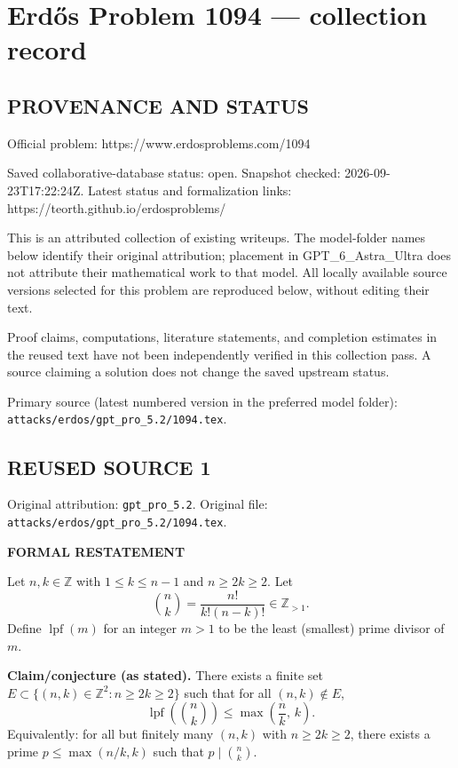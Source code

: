 \section*{Erd\H{o}s Problem 1094 --- collection record}

\subsection*{PROVENANCE AND STATUS}
Official problem: https://www.erdosproblems.com/1094

Saved collaborative-database status: open.
Snapshot checked: 2026-09-23T17:22:24Z.
Latest status and formalization links: https://teorth.github.io/erdosproblems/

This is an attributed collection of existing writeups. The model-folder names below identify their original attribution; placement in GPT\_6\_Astra\_Ultra does not attribute their mathematical work to that model. All locally available source versions selected for this problem are reproduced below, without editing their text.

Proof claims, computations, literature statements, and completion estimates in the reused text have not been independently verified in this collection pass. A source claiming a solution does not change the saved upstream status.

Primary source (latest numbered version in the preferred model folder): \texttt{attacks/erdos/gpt\_pro\_5.2/1094.tex}.

\subsection*{REUSED SOURCE 1}
Original attribution: \texttt{gpt\_pro\_5.2}.
Original file: \texttt{attacks/erdos/gpt\_pro\_5.2/1094.tex}.



\medskip
\noindent\textbf{FORMAL RESTATEMENT}

\smallskip
\noindent
Let $n,k\in\mathbb{Z}$ with $1\le k\le n-1$ and $n\ge 2k\ge 2$. Let
\[
\binom{n}{k}=\frac{n!}{k!(n-k)!}\in\mathbb{Z}_{>1}.
\]
Define $\operatorname{lpf}(m)$ for an integer $m>1$ to be the least (smallest) prime divisor of $m$.

\smallskip
\noindent
\textbf{Claim/conjecture (as stated).}
There exists a finite set $E\subset\{(n,k)\in\mathbb{Z}^2: n\ge 2k\ge 2\}$ such that for all $(n,k)\notin E$,
\[
\operatorname{lpf}\!\left(\binom{n}{k}\right)\le \max\left(\frac{n}{k},\,k\right).
\]
Equivalently: for all but finitely many $(n,k)$ with $n\ge 2k\ge 2$, there exists a prime $p\le \max(n/k,k)$ such that $p\mid\binom{n}{k}$.

